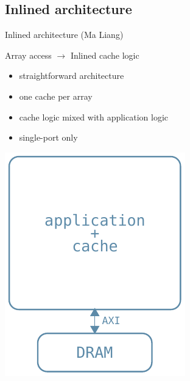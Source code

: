 \documentclass[handout]{beamer}
\begin{document}
\subsection{Inlined architecture}
\begin{frame}{Inlined architecture (Ma Liang)}
	\begin{minipage}{.7\textwidth}
		\begin{center}
			Array access $\rightarrow$ Inlined cache logic
		\end{center}

		\bigskip

		\begin{itemize}
			\item straightforward architecture
			\item one cache per array
			\item cache logic mixed with application logic
			\item single-port only
		\end{itemize}
	\end{minipage}
	\begin{minipage}{.28\textwidth}
		\begin{center}
			\includegraphics[width=.9\textwidth]{liang_arch.pdf}
		\end{center}
	\end{minipage}
\end{frame}
\end{document}

